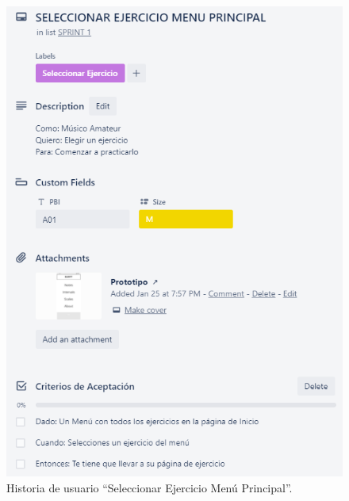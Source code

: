 \documentclass[12pt,twoside,titlepage]{report}
\begin{document}
\begin{figure}[H]
    \centering
    \includegraphics[scale=1.3]{Scrum/User Stories/MenuMain}
    \caption{Historia de usuario ``Seleccionar Ejercicio Menú Principal''.}
    \label{fig:MenuMain}
\end{figure}
\end{document}
